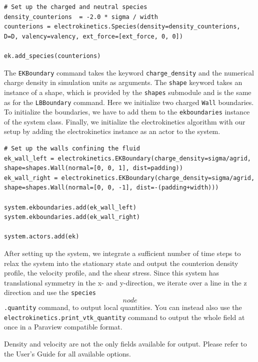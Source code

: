 \begin{lstlisting}[firstnumber=45]
# Set up the charged and neutral species
density_counterions  = -2.0 * sigma / width
counterions = electrokinetics.Species(density=density_counterions, D=D, valency=valency, ext_force=[ext_force, 0, 0])

ek.add_species(counterions)
\end{lstlisting}

The \texttt{EKBoundary} command takes the keyword \texttt{charge\_density} and the numerical charge density in simulation units as arguments. The \texttt{shape} keyword takes an instance of a shape, which is provided by the \texttt{shapes} submodule and is the same as for the \texttt{LBBoundary} command. Here we initialize two charged \texttt{Wall} boundaries. To initialize the boundaries, we have to add them to the \texttt{ekboundaries} instance of the system class. Finally, we initialize the electrokinetics algorithm with our setup by adding the electrokinetics instance as an actor to the system.

\begin{lstlisting}[firstnumber=53]
# Set up the walls confining the fluid
ek_wall_left = electrokinetics.EKBoundary(charge_density=sigma/agrid, shape=shapes.Wall(normal=[0, 0, 1], dist=padding)) 
ek_wall_right = electrokinetics.EKBoundary(charge_density=sigma/agrid, shape=shapes.Wall(normal=[0, 0, -1], dist=-(padding+width)))

system.ekboundaries.add(ek_wall_left)
system.ekboundaries.add(ek_wall_right)

system.actors.add(ek)
\end{lstlisting}

After setting up the system, we integrate a sufficient number of time steps to relax the system into the stationary state and output the counterion density profile, the velocity profile, and the shear stress. Since this system has translational symmetry in the x- and y-direction, we iterate over a line in the z direction and use the \texttt{species\[node\].quantity} command, to output local quantities. You can instead also use the \texttt{electrokinetics.print\_vtk\_quantity} command to output the whole field at once in a Paraview compatible format.

Density and velocity are not the only fields available for output. Please refer to the User's Guide for all available options.

